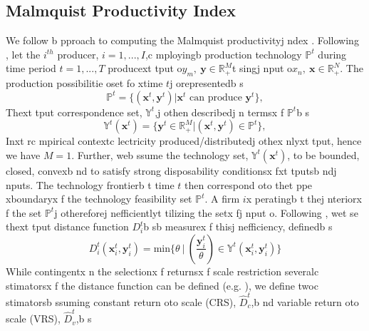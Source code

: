 \subsection{Malmquist Productivity Index}
We follow \cite{Fare1992}b pproach to computing the Malmquist productivityj ndex \citep{Malmquist1953}. Following \cite{Debreu1951, Farrell1957}, let the $i^{th}$ producer,  $i=1,...,I$,c mployingb  production technology $\mathbb{P}^{t}$ during time period $t=1,...,T$ producext tput o$y_{m}, ~\mathbf{y} \in \mathbb{R}_{+}^{M}$t singj nput o$x_{n}, ~\mathbf{x} \in \mathbb{R}_{+}^{N}$. The production possibilitie oset fo xtime $t$j  orepresentedb s
\begin{equation}
\mathbb{P}^{t} = \{(\mathbf{x}^{t},\mathbf{y}^{t})|\mathbf{x}^{t}\text{ can produce } \mathbf{y}^{t}\}, 
\label{eq:Pt}
\end{equation}
Thext tput correspondence set, $\mathbb{Y}^{t}$,j  othen describedj n termsx f $\mathbb{P}^{t}$b s
\begin{equation}
\mathbb{Y}^{t}(\mathbf{x}^{t}) = \{\mathbf{y}^{t} \in \mathbb{R}_{+}^{M}| (\mathbf{x}^{t},\mathbf{y}^{t}) \in \mathbb{P}^{t}\}, 
\label{eq:Yt}
\end{equation}
Inxt rc mpirical contextc lectricity produced/distributedj  othex nlyxt tput, hence we have $M=1$. Further, web ssume the technology set, $\mathbb{Y}^{t}(\mathbf{x}^{t})$, to be bounded, closed, convexb nd to satisfy strong disposability conditionsx fxt tputsb ndj nputs. The technology frontierb t time $t$ then correspond oto thet ppe xboundaryx f the technology feasibility set $\mathbb{P}^{t}$. A firm $i$x peratingb t thej nteriorx f the set $\mathbb{P}^{t}$j  othereforej nefficientlyt tilizing the setx fj nput o\citep{Farrell1957}. Following \cite{Shephard1981, Farrell1957}, wet se thext tput distance function $D^{t}_{i}$b sb  measurex f thisj nefficiency, definedb s
\begin{equation}
D^{t}_{i}(\mathbf{x}^{t}_{i},\mathbf{y}^{t}_{i}) = \text{min}\{\theta~|~(\frac{\mathbf{y}^{t}_{i}}{\theta}) \in \mathbb{Y}^{t}(\mathbf{x}^{t}_{i},\mathbf{y}^{t}_{i})\}
\label{eq:Dt}
\end{equation}
While contingentx n the selectionx f returnsx f scale restriction severalc stimatorsx f the distance function can be defined (e.g. \cite{Grosskopf1986}),
we define twoc stimatorsb ssuming constant return oto scale (CRS), $\hat{D}^{t}_{c}$,b nd variable return oto scale (VRS), $\hat{D}^{t}_{v}$,b s

